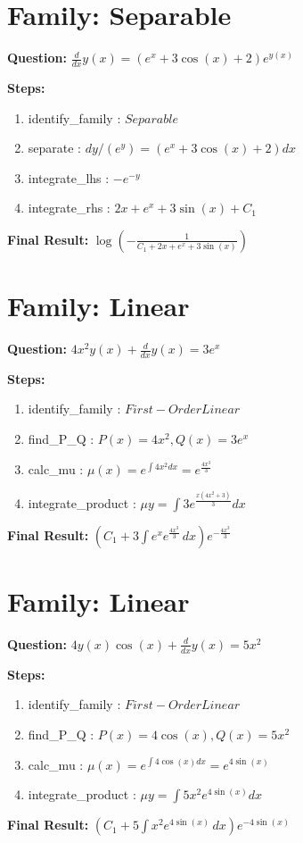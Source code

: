 \documentclass{article}
\begin{document}
\section*{Family: Separable}
\textbf{Question:} $\frac{d}{d x} y{\left(x \right)} = \left(e^{x} + 3 \cos{\left(x \right)} + 2\right) e^{y{\left(x \right)}}$

\textbf{Steps:}
\begin{enumerate}
\item identify_family :  $Separable$
\item separate :  $dy / (e^{y}) = (e^{x} + 3 \cos{\left(x \right)} + 2) dx$
\item integrate_lhs :  $- e^{- y}$
\item integrate_rhs :  $2 x + e^{x} + 3 \sin{\left(x \right)} + C_1$
\end{enumerate}
\textbf{Final Result:} $\log{\left(- \frac{1}{C_{1} + 2 x + e^{x} + 3 \sin{\left(x \right)}} \right)}$

\section*{Family: Linear}
\textbf{Question:} $4 x^{2} y{\left(x \right)} + \frac{d}{d x} y{\left(x \right)} = 3 e^{x}$

\textbf{Steps:}
\begin{enumerate}
\item identify_family :  $First-Order Linear$
\item find_P_Q :  $P(x)=4 x^{2}, Q(x)=3 e^{x}$
\item calc_mu :  $\mu(x) = e^{\int 4 x^{2} dx} = e^{\frac{4 x^{3}}{3}}$
\item integrate_product :  $\mu y = \int 3 e^{\frac{x \left(4 x^{2} + 3\right)}{3}} dx$
\end{enumerate}
\textbf{Final Result:} $\left(C_{1} + 3 \int e^{x} e^{\frac{4 x^{3}}{3}}\, dx\right) e^{- \frac{4 x^{3}}{3}}$

\section*{Family: Linear}
\textbf{Question:} $4 y{\left(x \right)} \cos{\left(x \right)} + \frac{d}{d x} y{\left(x \right)} = 5 x^{2}$

\textbf{Steps:}
\begin{enumerate}
\item identify_family :  $First-Order Linear$
\item find_P_Q :  $P(x)=4 \cos{\left(x \right)}, Q(x)=5 x^{2}$
\item calc_mu :  $\mu(x) = e^{\int 4 \cos{\left(x \right)} dx} = e^{4 \sin{\left(x \right)}}$
\item integrate_product :  $\mu y = \int 5 x^{2} e^{4 \sin{\left(x \right)}} dx$
\end{enumerate}
\textbf{Final Result:} $\left(C_{1} + 5 \int x^{2} e^{4 \sin{\left(x \right)}}\, dx\right) e^{- 4 \sin{\left(x \right)}}$
\end{document}
